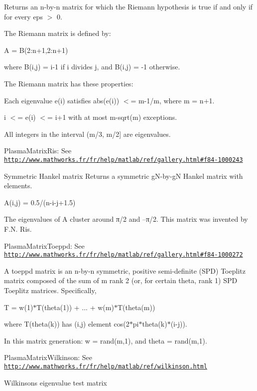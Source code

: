 Returns an n-\/by-\/n matrix for which the Riemann hypothesis is true if and only if for every eps $>$ 0.

The Riemann matrix is defined by\+:

A = B(2\+:n+1,2\+:n+1)

where B(i,j) = i-\/1 if i divides j, and B(i,j) = -\/1 otherwise.

The Riemann matrix has these properties\+:
\begin{DoxyItemize}
\item Each eigenvalue e(i) satisfies abs(e(i)) $<$= m-\/1/m, where m = n+1.
\item i $<$= e(i) $<$= i+1 with at most m-\/sqrt(m) exceptions.
\item All integers in the interval (m/3, m/2\mbox{]} are eigenvalues.
\end{DoxyItemize}

\begin{DoxyItemize}
\item Plasma\+Matrix\+Ris\+: See \href{http://www.mathworks.fr/fr/help/matlab/ref/gallery.html#f84-1000243}{\tt http\+://www.\+mathworks.\+fr/fr/help/matlab/ref/gallery.\+html\#f84-\/1000243}\end{DoxyItemize}
Symmetric Hankel matrix Returns a symmetric g\+N-\/by-\/g\+N Hankel matrix with elements. \begin{DoxyVerb}A(i,j) = 0.5/(n-i-j+1.5)
\end{DoxyVerb}


The eigenvalues of A cluster around π/2 and –π/2. This matrix was invented by F.\+N. Ris.

\begin{DoxyItemize}
\item Plasma\+Matrix\+Toeppd\+: See \href{http://www.mathworks.fr/fr/help/matlab/ref/gallery.html#f84-1000272}{\tt http\+://www.\+mathworks.\+fr/fr/help/matlab/ref/gallery.\+html\#f84-\/1000272}\end{DoxyItemize}
A toeppd matrix is an n-\/by-\/n symmetric, positive semi-\/definite (S\+P\+D) Toeplitz matrix composed of the sum of m rank 2 (or, for certain theta, rank 1) S\+P\+D Toeplitz matrices. Specifically,

T = w(1)$\ast$\+T(theta(1)) + ... + w(m)$\ast$\+T(theta(m))

where T(theta(k)) has (i,j) element cos(2$\ast$pi$\ast$theta(k)$\ast$(i-\/j)).

In this matrix generation\+: w = rand(m,1), and theta = rand(m,1).

\begin{DoxyItemize}
\item Plasma\+Matrix\+Wilkinson\+: See \href{http://www.mathworks.fr/fr/help/matlab/ref/wilkinson.html}{\tt http\+://www.\+mathworks.\+fr/fr/help/matlab/ref/wilkinson.\+html}\end{DoxyItemize}
Wilkinson\textquotesingle{}s eigenvalue test matrix

